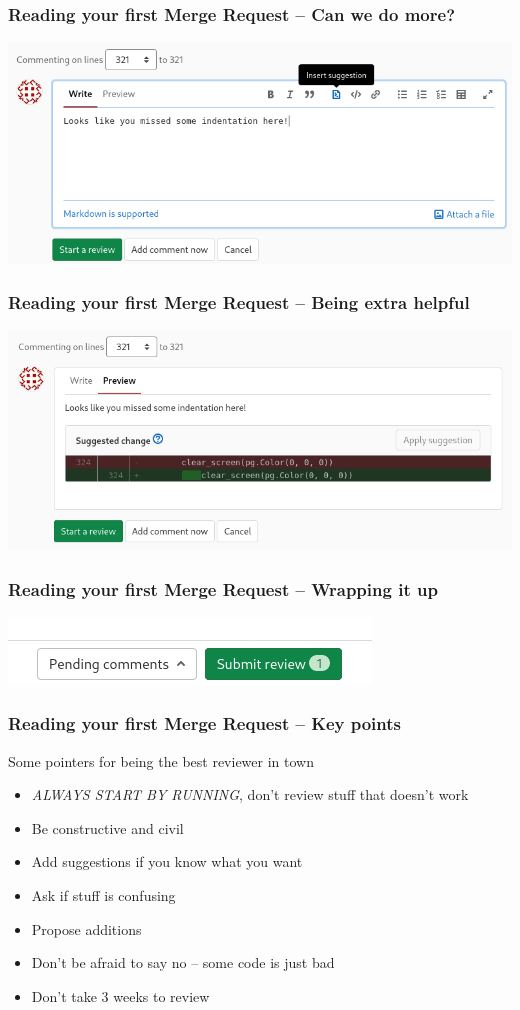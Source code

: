 \documentclass{beamer}
\begin{document}
\begin{frame}[fragile]
  \frametitle{Reading your first Merge Request -- Can we do more?}
  \includegraphics[width=\linewidth]{gitlab-first-review/08-sugg.png}
\end{frame}

\begin{frame}[fragile]
  \frametitle{Reading your first Merge Request -- Being extra helpful}
  \includegraphics[width=\linewidth]{gitlab-first-review/09-preview.png}
\end{frame}

\begin{frame}[fragile]
  \frametitle{Reading your first Merge Request -- Wrapping it up}
  \includegraphics[width=\linewidth]{gitlab-first-review/10-submit.png}
\end{frame}

\begin{frame}[fragile]
  \frametitle{Reading your first Merge Request -- Key points}

  Some pointers for being the best reviewer in town
  \begin{itemize}[<+->]
    \item \emph{ALWAYS START BY RUNNING}, don't review stuff that doesn't work
    \item Be constructive and civil
    \item Add suggestions if you know what you want
    \item Ask if stuff is confusing
    \item Propose additions
    \item Don't be afraid to say no -- some code is just bad
    \item Don't take 3 weeks to review
  \end{itemize}
\end{frame}
\end{document}
